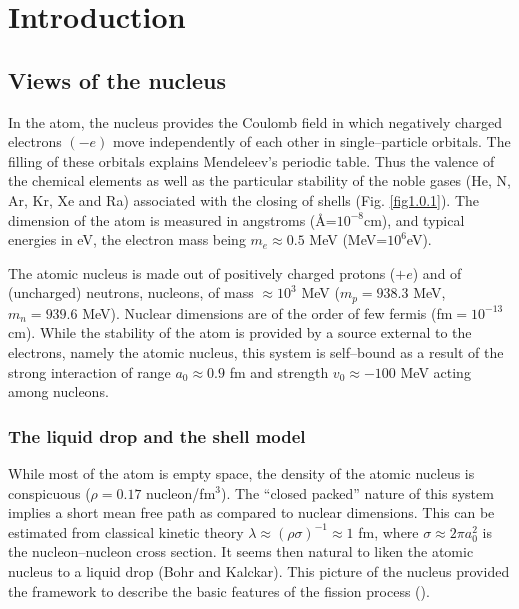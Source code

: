 \documentclass[a4paper,11pt]{book}
\numberwithin{equation}{section}
\numberwithin{figure}{section}
\numberwithin{table}{section}
\begin{document}
	\chapter{Introduction}
\section{Views of the nucleus}
In the atom, the nucleus provides the Coulomb field in which negatively charged electrons $(-e)$ move independently of each other in single--particle orbitals. The filling of these orbitals explains Mendeleev's periodic table. Thus the valence of the chemical elements as well as the particular stability of the noble gases (He, N, Ar, Kr, Xe and Ra) associated with the closing of shells (Fig. \ref{fig1.0.1}). The dimension of the atom is measured in angstroms (\AA=$10^{-8}$cm), and typical energies in eV, the electron mass being $m_e\approx 0.5$ MeV (MeV=$10^6$eV).


The atomic nucleus is made out of positively charged protons ($+e$) and of (uncharged) neutrons, nucleons, of mass $\approx 10^3$ MeV ($m_p=938.3$ MeV, $m_n=939.6$ MeV). Nuclear dimensions are of the order of few fermis (fm$=10^{-13}$ cm). While the stability of the atom is provided by a source external to the electrons, namely the atomic nucleus, this system is  self--bound as a result of the strong interaction of range $a_0\approx 0.9$ fm and strength $v_0\approx -100$ MeV acting among nucleons. 
\subsection{The liquid drop and the shell model}
While most of the atom is empty space, the density of the atomic nucleus is conspicuous ($\rho=0.17$ nucleon/fm$^3$). The ``closed packed'' nature of this system implies a short mean free path as compared to nuclear dimensions. This can be estimated from classical kinetic theory $\lambda\approx(\rho\sigma)^{-1}\approx1$ fm, where $\sigma\approx 2\pi a_0^2$ is the nucleon--nucleon cross section. It seems then natural to liken the atomic nucleus to a liquid drop (Bohr and Kalckar).
This picture of the nucleus provided the framework to describe the basic features of the fission process (\cite{Meitner:39,Bohr:39}). 
\end{document}
